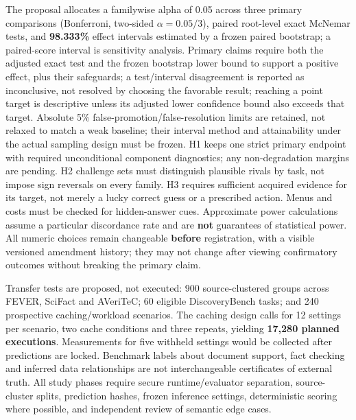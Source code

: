 \documentclass[11pt,a4paper]{article}
\begin{document}
The proposal allocates a familywise alpha of 0.05 across three primary
comparisons (Bonferroni, two-sided \(\alpha=0.05/3\)), paired root-level
exact McNemar tests, and \textbf{98.333\%} effect intervals estimated by
a frozen paired bootstrap; a paired-score interval is sensitivity
analysis. Primary claims require both the adjusted exact test and the
frozen bootstrap lower bound to support a positive effect, plus their
safeguards; a test/interval disagreement is reported as inconclusive,
not resolved by choosing the favorable result; reaching a point target
is descriptive unless its adjusted lower confidence bound also exceeds
that target. Absolute 5\% false-promotion/false-resolution limits are
retained, not relaxed to match a weak baseline; their interval method
and attainability under the actual sampling design must be frozen. H1
keeps one strict primary endpoint with required unconditional component
diagnostics; any non-degradation margins are pending. H2 challenge sets
must distinguish plausible rivals by task, not impose sign reversals on
every family. H3 requires sufficient acquired evidence for its target,
not merely a lucky correct guess or a prescribed action. Menus and costs
must be checked for hidden-answer cues. Approximate power calculations
assume a particular discordance rate and are \textbf{not} guarantees of
statistical power. All numeric choices remain changeable \textbf{before}
registration, with a visible versioned amendment history; they may not
change after viewing confirmatory outcomes without breaking the primary
claim.

Transfer tests are proposed, not executed: 900 source-clustered groups
across FEVER, SciFact and AVeriTeC; 60 eligible DiscoveryBench tasks;
and 240 prospective caching/workload scenarios. The caching design calls
for 12 settings per scenario, two cache conditions and three repeats,
yielding \textbf{17,280 planned executions}. Measurements for five
withheld settings would be collected after predictions are locked.
Benchmark labels about document support, fact checking and inferred data
relationships are not interchangeable certificates of external truth.
All study phases require secure runtime/evaluator separation,
source-cluster splits, prediction hashes, frozen inference settings,
deterministic scoring where possible, and independent review of semantic
edge cases.
\end{document}

